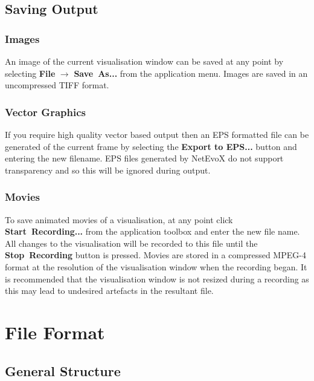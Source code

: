 \documentclass[a4paper, 11pt]{article}
\newcommand{\guitxt}[1]{{\textbf{\textsf{\small{#1}}}}}
\begin{document}
\subsection{Saving Output}

\subsubsection{Images}
An image of the current visualisation window can be saved at any point by selecting \guitxt{File} $\rightarrow$ \guitxt{Save~As...} from the application menu. Images are saved in an uncompressed TIFF format.

\subsubsection{Vector Graphics}
If you require high quality vector based output then an EPS formatted file can be generated of the current frame by selecting the \guitxt{Export to EPS...} button and entering the new filename. EPS files generated by NetEvoX do not support transparency and so this will be ignored during output.

\subsubsection{Movies}
To save animated movies of a visualisation, at any point click \guitxt{Start~Recording...} from the application toolbox and enter the new file name. All changes to the visualisation will be recorded to this file until the \guitxt{Stop~Recording} button is pressed. Movies are stored in a compressed MPEG-4 format at the resolution of the visualisation window when the recording began. It is recommended that the visualisation window is not resized during a recording as this may lead to undesired artefacts in the resultant file.

\section{\label{sec:fileFormat}File Format}

\subsection{General Structure}
\end{document}
